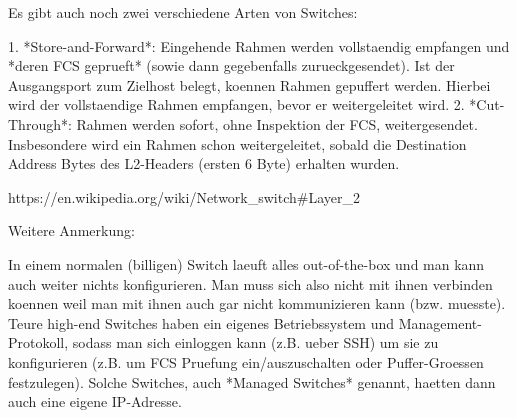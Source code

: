 Es gibt auch noch zwei verschiedene Arten von Switches:

1. *Store-and-Forward*: Eingehende Rahmen werden vollstaendig empfangen und
   *deren FCS geprueft* (sowie dann gegebenfalls zurueckgesendet). Ist der
   Ausgangsport zum Zielhost belegt, koennen Rahmen gepuffert werden. Hierbei
   wird der vollstaendige Rahmen empfangen, bevor er weitergeleitet wird.
2. *Cut-Through*: Rahmen werden sofort, ohne Inspektion der FCS,
   weitergesendet. Insbesondere wird ein Rahmen schon weitergeleitet, sobald die
   Destination Address Bytes des L2-Headers (ersten 6 Byte) erhalten wurden.

https://en.wikipedia.org/wiki/Network\_switch\#Layer\_2

Weitere Anmerkung:

In einem normalen (billigen) Switch laeuft alles out-of-the-box und man kann
auch weiter nichts konfigurieren. Man muss sich also nicht mit ihnen verbinden
koennen weil man mit ihnen auch gar nicht kommunizieren kann
(bzw. muesste). Teure high-end Switches haben ein eigenes Betriebssystem und
Management-Protokoll, sodass man sich einloggen kann (z.B. ueber SSH) um sie zu
konfigurieren (z.B. um FCS Pruefung ein/auszuschalten oder Puffer-Groessen
festzulegen). Solche Switches, auch *Managed Switches* genannt, haetten dann
auch eine eigene IP-Adresse.
